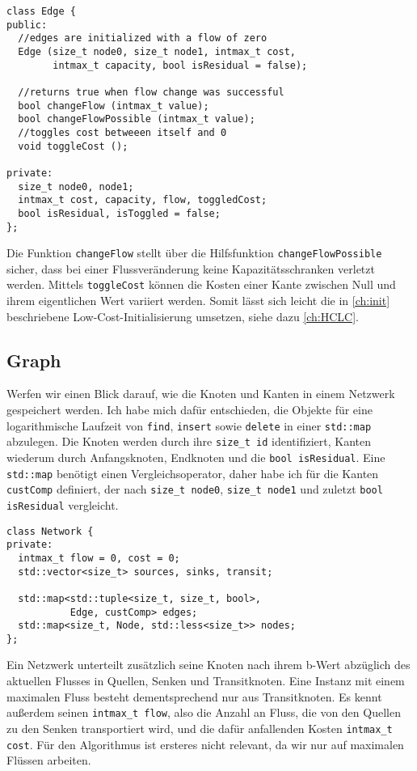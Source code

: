 \begin{lstlisting}
class Edge {
public:
  //edges are initialized with a flow of zero
  Edge (size_t node0, size_t node1, intmax_t cost,
        intmax_t capacity, bool isResidual = false);

  //returns true when flow change was successful
  bool changeFlow (intmax_t value);
  bool changeFlowPossible (intmax_t value);
  //toggles cost betweeen itself and 0
  void toggleCost ();

private:
  size_t node0, node1;
  intmax_t cost, capacity, flow, toggledCost;
  bool isResidual, isToggled = false;
};
\end{lstlisting}

Die Funktion \lstinline|changeFlow| stellt über die Hilfsfunktion \lstinline|changeFlowPossible| sicher, dass bei einer Flussveränderung keine Kapazitätsschranken verletzt werden. Mittels \lstinline|toggleCost| können die Kosten einer Kante zwischen Null und ihrem eigentlichen Wert variiert werden. Somit lässt sich leicht die in \cref{ch:init} beschriebene Low-Cost-Initialisierung umsetzen, siehe dazu \cref{ch:HCLC}.

\subsection{Graph}\label{ch:graph}
Werfen wir einen Blick darauf, wie die Knoten und Kanten in einem Netzwerk gespeichert werden. Ich habe mich dafür entschieden, die Objekte für eine logarithmische Laufzeit von \lstinline|find|, \lstinline|insert| sowie \lstinline|delete| in einer \lstinline|std::map| abzulegen. Die Knoten werden durch ihre \lstinline|size_t id| identifiziert, Kanten wiederum durch Anfangsknoten, Endknoten und die \lstinline|bool isResidual|. Eine \lstinline|std::map| benötigt einen Vergleichsoperator, daher habe ich für die Kanten \lstinline|custComp| definiert, der nach \lstinline|size_t node0|, \lstinline|size_t node1| und zuletzt \lstinline|bool isResidual| vergleicht.

\begin{lstlisting}
class Network {
private:
  intmax_t flow = 0, cost = 0;
  std::vector<size_t> sources, sinks, transit;

  std::map<std::tuple<size_t, size_t, bool>,
           Edge, custComp> edges;
  std::map<size_t, Node, std::less<size_t>> nodes;
};
\end{lstlisting}

Ein Netzwerk unterteilt zusätzlich seine Knoten nach ihrem b-Wert abzüglich des aktuellen Flusses in Quellen, Senken und Transitknoten. Eine Instanz mit einem maximalen Fluss besteht dementsprechend nur aus Transitknoten. Es kennt außerdem seinen \lstinline|intmax_t flow|, also die Anzahl an Fluss, die von den Quellen zu den Senken transportiert wird, und die dafür anfallenden Kosten \lstinline|intmax_t cost|. Für den Algorithmus ist ersteres nicht relevant, da wir nur auf maximalen Flüssen arbeiten.

